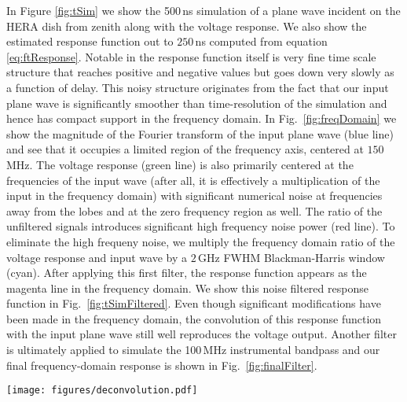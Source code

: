 \documentclass[useAMS,usenatbib]{mn2e}
\begin{document}
In Figure \ref{fig:tSim} we show the 500\,ns simulation of a plane wave incident on the HERA dish from zenith along with the voltage response. We also show the estimated response function out to $250$\,ns computed from equation \ref{eq:ftResponse}. Notable in the response function itself is very fine time scale structure that reaches positive and negative values but goes down very slowly as a function of delay. This noisy structure originates from the fact that our input plane wave is significantly smoother than time-resolution of the simulation and hence has compact support in the frequency domain. In Fig.~\ref{fig:freqDomain} we show the magnitude of the Fourier transform of the input plane wave (blue line) and see that it occupies a limited region of the frequency axis, centered at $150$\,MHz.  The voltage response (green line) is also primarily centered at the frequencies of the input wave (after all, it is effectively a multiplication of the input in the frequency domain) with significant numerical noise at frequencies away from the lobes and at the zero frequency region as well. The ratio of the unfiltered signals introduces significant high frequency noise power (red line). To eliminate the high frequeny noise, we multiply the frequency domain ratio of the voltage response and input wave by a $2$\,GHz FWHM Blackman-Harris window (cyan). After applying this first filter, the response function appears as the magenta line in the frequency domain. We show this noise filtered response function in Fig.~\ref{fig:tSimFiltered}. Even though significant modifications have been made in the frequency domain, the convolution of this response function with the input plane wave still well reproduces the voltage output. Another filter is ultimately applied to simulate the 100\,MHz instrumental bandpass and our final frequency-domain response is shown in Fig.~\ref{fig:finalFilter}.
\begin{figure*}
\texttt{[image: figures/deconvolution.pdf]}
\caption{Simulated voltage levels from an input plane wave (blue line) as a function of time. The voltage response at the feed output (green line) is effectively the convolution of the input wave with the time-domain response function of the dish. We recover this response function by dividing the FFT of the voltage response with the FFT of the input plane wave and take the inverse transform to light red curve. We note that the measured response function only goes out to 250\,ns since an FFT deconvolution determines the response function between $-\tau/2$ and $\tau/2$ for a $\tau$ lenght simulation. In order to check our measured response function, we perform a direct convolution of the response with the input plane wave and recover the red points.}
\label{fig:tSim}
\end{figure*}
\end{document}
